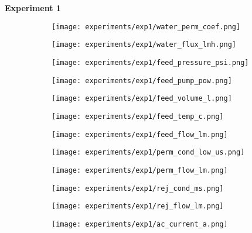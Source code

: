 \documentclass{article}
\begin{document}
    \textbf{Experiment 1}
    \begin{figure}[H]
        \centering
        \begin{subfigure}{0.48\linewidth}
		    \texttt{[image: experiments/exp1/water\_perm\_coef.png]}
	    \end{subfigure}
	    \begin{subfigure}{0.48\linewidth}
		    \texttt{[image: experiments/exp1/water\_flux\_lmh.png]}
	    \end{subfigure}
	    \begin{subfigure}{0.48\linewidth}
		    \texttt{[image: experiments/exp1/feed\_pressure\_psi.png]}
	    \end{subfigure}
	    \begin{subfigure}{0.48\linewidth}
		    \texttt{[image: experiments/exp1/feed\_pump\_pow.png]}
	    \end{subfigure}
	    \begin{subfigure}{0.48\linewidth}
		    \texttt{[image: experiments/exp1/feed\_volume\_l.png]}
	    \end{subfigure}
	    \begin{subfigure}{0.48\linewidth}
		    \texttt{[image: experiments/exp1/feed\_temp\_c.png]}
	    \end{subfigure}
	    \begin{subfigure}{0.48\linewidth}
		    \texttt{[image: experiments/exp1/feed\_flow\_lm.png]}
	    \end{subfigure}
	    \begin{subfigure}{0.48\linewidth}
		    \texttt{[image: experiments/exp1/perm\_cond\_low\_us.png]}
	    \end{subfigure}
	    \begin{subfigure}{0.48\linewidth}
		    \texttt{[image: experiments/exp1/perm\_flow\_lm.png]}
	    \end{subfigure}
	    \begin{subfigure}{0.48\linewidth}
		    \texttt{[image: experiments/exp1/rej\_cond\_ms.png]}
	    \end{subfigure}
	    \begin{subfigure}{0.48\linewidth}
		    \texttt{[image: experiments/exp1/rej\_flow\_lm.png]}
	    \end{subfigure}
	    \begin{subfigure}{0.48\linewidth}
		    \texttt{[image: experiments/exp1/ac\_current\_a.png]}
	    \end{subfigure}
    \end{figure}
    
\end{document}

